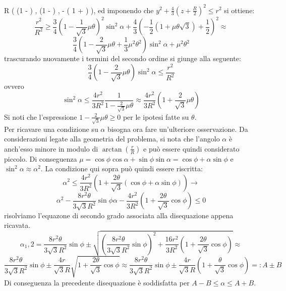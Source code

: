   R \left(  \left(1 -  \mu \theta \right) \cos \alpha ,  \left(1 -  \mu \theta \right) \sin \alpha ,
  - \left( 1 + \mu \theta {} \right) \right)\), ed imponendo che \(y^2 + \frac{4}{3} \left( z + \frac{R}{2} \right)^2 \le r^2 \) si ottiene:
  $$ \frac{r^2}{R^2} \ge \frac{3}{4} \left(1 - \frac{1}{\sqrt{3}} \mu \theta \right)^2 \sin^2 \alpha + \frac{4}{3} \left( -\frac{1}{2} \left( 1 + \mu \theta \sqrt{3} \right) + \frac{1}{2} \right)^2 \approx  $$
  $$ \frac{3}{4} \left(1 - \frac{2}{\sqrt{3}} \mu \theta + \frac{1}{3} \mu^2 \theta^2 \right)\sin^2\alpha + \mu^2 \theta^2 $$
  trascurando nuovamente i termini del secondo ordine si giunge alla seguente:
  $$ \frac{3}{4} \left(1 - \frac{2}{\sqrt{3}} \mu \theta \right)\sin^2\alpha \le \frac{r^2}{R^2} $$
  ovvero
  $$ \sin^2\alpha \le \frac{4r^2}{3R^2} \frac{1}{1 - \frac{2}{\sqrt{3}} \mu \theta} \approx \frac{4r^2}{3R^2} \left(1 + \frac{2}{\sqrt{3}} \mu \theta \right)  $$
  Si noti che l'espressione \(1 - \frac{2}{\sqrt{3}} \mu \theta \ge 0\) per le ipotesi fatte su \(\theta\).\\
  Per ricavare una condizione su \(\alpha\) bisogna ora fare un'ulteriore osservazione. Da considerazioni legate alla geometria del problema, si nota che l'angolo \(\alpha\) è anch'esso
  minore in modulo di \(\arctan\left( \frac{r}{R} \right)\) e può essere quindi considerato piccolo. Di conseguenza \(\mu = \cos \phi \cos \alpha + \sin \phi \sin \alpha = \cos \phi + \alpha \sin \phi \)
  e \(\sin^2 \alpha \approx \alpha^2\). La condizione qui sopra può quindi essere riscritta:
  $$ \alpha^2 \le  \frac{4r^2}{3R^2} \left(1 + \frac{2\theta}{\sqrt{3}} \left( \cos \phi + \alpha \sin \phi \right)  \right)  \to $$
  $$ \alpha^2 -\frac{8r^2\theta}{3\sqrt{3}R^2}\sin \phi \alpha -\frac{4r^2}{3R^2}\left( 1 +\frac{2 \theta}{\sqrt{3}} \cos \phi \right) \le 0 $$
  risolviamo l'equazone di secondo grado associata alla disequazione appena ricavata.
  $$ \alpha{_1,2} = \frac{8r^2\theta}{3\sqrt{3}R^2}\sin \phi \pm \sqrt{ \left( \frac{8r^2\theta}{3\sqrt{3}R^2}\sin \phi \right)^2 + \frac{16r^2}{3R^2}\left( 1 +\frac{2 \theta}{\sqrt{3}} \cos \phi \right)} \approx $$
  $$ \frac{8r^2\theta}{3\sqrt{3}R^2}\sin \phi \pm \frac{4r}{\sqrt{3}R}\sqrt{ 1 +\frac{2 \theta}{\sqrt{3}} \cos \phi} \approx \frac{8r^2\theta}{3\sqrt{3}R^2}\sin \phi \pm \frac{4r}{\sqrt{3}R}\left( 1 +\frac{\theta}{\sqrt{3}} \cos \phi \right) =: A \pm B$$
  Di conseguenza la precedente disequazione è soddisfatta per \(A-B\le \alpha \le A + B\).\\
